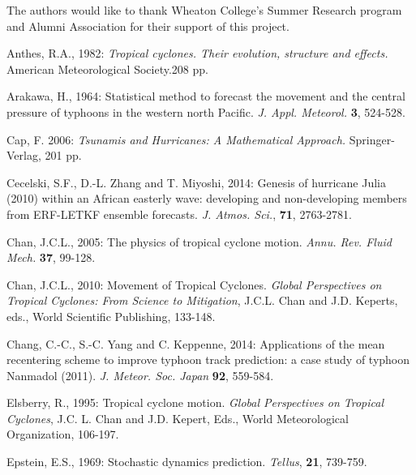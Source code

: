 \documentclass[a4paper, 12pt]{article}
\begin{document}
{ The authors would like to thank Wheaton College's Summer Research  program and Alumni Association for their support of this project.



\begin{list}{}{\leftmargin=1em \itemindent=-2em}


\item Anthes, R.A., 1982: \emph{Tropical cyclones. Their evolution, structure and effects.} American Meteorological Society.208 pp.

\item  Arakawa, H., 1964: Statistical method to forecast the movement and the central pressure of typhoons in the western north Pacific.  \emph{J. Appl. Meteorol.} {\bf 3}, 524-528.


\item Cap, F. 2006: {\em Tsunamis and Hurricanes: A Mathematical Approach.} Springer-Verlag, 201 pp.

\item Cecelski, S.F., D.-L. Zhang and T. Miyoshi, 2014: Genesis of hurricane Julia (2010) within an African easterly wave: developing and non-developing members from ERF-LETKF ensemble forecasts. \emph{J. Atmos. Sci.}, {\bf 71}, 2763-2781.

\item Chan, J.C.L., 2005: The physics of tropical cyclone motion. \emph{Annu. Rev. Fluid Mech.} {\bf 37}, 99-128.

\item Chan, J.C.L., 2010: Movement of Tropical Cyclones. \emph{Global Perspectives on Tropical Cyclones: From Science to Mitigation}, J.C.L. Chan and J.D. Keperts, eds., World Scientific Publishing, 133-148.


\item  Chang, C.-C., S.-C. Yang and C. Keppenne, 2014: Applications of the mean recentering scheme to improve typhoon track prediction:  a case study of typhoon Nanmadol (2011). \emph{J. Meteor. Soc. Japan} {\bf 92}, 559-584.



\item Elsberry, R., 1995: Tropical cyclone motion. \emph{Global Perspectives on Tropical Cyclones}, J.C. L. Chan and J.D. Kepert, Eds., World Meteorological Organization, 106-197.

\item Epstein, E.S., 1969: Stochastic dynamics prediction. \emph{Tellus}, {\bf 21}, 739-759.



\end{list}}
\end{document}
